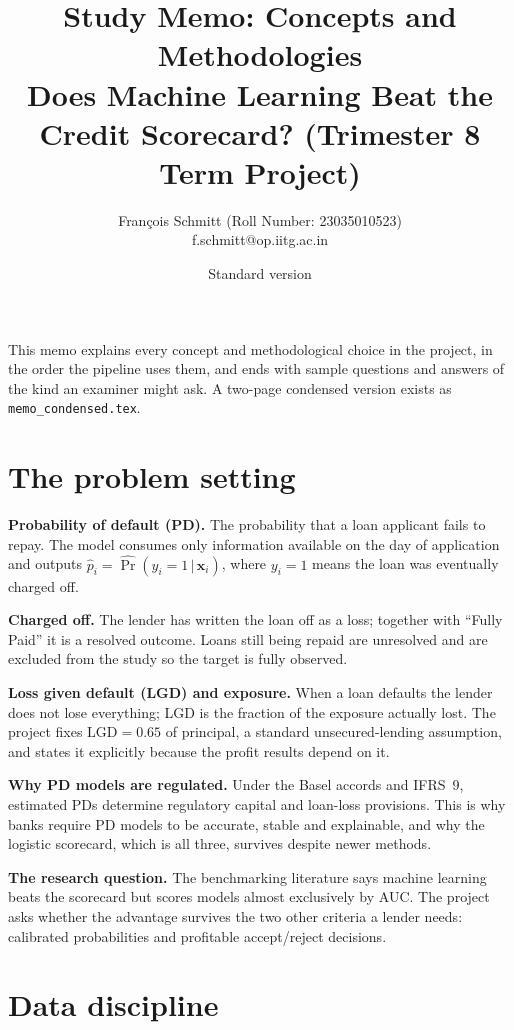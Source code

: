 \documentclass[a4paper,11pt]{article}
\title{\bfseries Study Memo: Concepts and Methodologies\\
\large Does Machine Learning Beat the Credit Scorecard? (Trimester 8 Term Project)}
\author{François Schmitt (Roll Number: 23035010523)\\
\ttfamily f.schmitt@op.iitg.ac.in}
\date{Standard version}
\newcommand{\term}[1]{\textbf{#1}}
\begin{document}
\maketitle

\noindent This memo explains every concept and methodological choice in the project, in the order the pipeline uses them, and ends with sample questions and answers of the kind an examiner might ask. A two-page condensed version exists as \texttt{memo\_condensed.tex}.

\section{The problem setting}

\term{Probability of default (PD).} The probability that a loan applicant fails to repay. The model consumes only information available on the day of application and outputs $\hat p_i = \widehat{\Pr}(y_i=1\,|\,\mathbf{x}_i)$, where $y_i=1$ means the loan was eventually charged off.

\term{Charged off.} The lender has written the loan off as a loss; together with ``Fully Paid'' it is a resolved outcome. Loans still being repaid are unresolved and are excluded from the study so the target is fully observed.

\term{Loss given default (LGD) and exposure.} When a loan defaults the lender does not lose everything; LGD is the fraction of the exposure actually lost. The project fixes $\mathrm{LGD}=0.65$ of principal, a standard unsecured-lending assumption, and states it explicitly because the profit results depend on it.

\term{Why PD models are regulated.} Under the Basel accords and IFRS~9, estimated PDs determine regulatory capital and loan-loss provisions. This is why banks require PD models to be accurate, stable and explainable, and why the logistic scorecard, which is all three, survives despite newer methods.

\term{The research question.} The benchmarking literature says machine learning beats the scorecard but scores models almost exclusively by AUC. The project asks whether the advantage survives the two other criteria a lender needs: calibrated probabilities and profitable accept/reject decisions.

\section{Data discipline}
\end{document}
